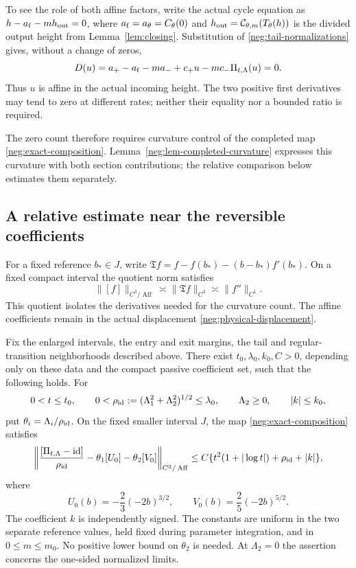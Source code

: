 To see the role of both affine factors, write the actual cycle
equation as \(h-a_{\rm f}-mh_{\rm out}=0\), where
\(a_{\rm f}=a_\theta=C_\theta(0)\) and
\(h_{\rm out}=\mathcal C_{\theta,m}(T_\theta(h))\) is the divided
output height from Lemma~\ref{lem:closing}. Substitution of
\eqref{neg:tail-normalizations} gives, without a change of zeros,
\begin{equation}\label{neg:physical-displacement}
 D(u)=a_+-a_{\rm f}-ma_-+c_+u-mc_-\Pi_{t,\Lambda}(u)=0 .
\end{equation}
Thus \(u\) is affine in the actual incoming height. The two
positive first derivatives may tend to zero at different rates;
neither their equality nor a bounded ratio is required.

The zero count therefore requires curvature control of the completed map
\eqref{neg:exact-composition}. Lemma~\ref{neg:lem-completed-curvature}
expresses this curvature with both section contributions; the relative
comparison below estimates them separately.

\subsection{A relative estimate near the reversible coefficients}

For a fixed reference \(b_*\in J\), write
\(\mathfrak T f=f-f(b_*)-(b-b_*)f'(b_*)\).
On a fixed compact interval the quotient norm satisfies
\[
 \|[f]\|_{C^3/\operatorname{Aff}}
      \asymp\|\mathfrak T f\|_{C^3}\asymp\|f''\|_{C^1} .
\]
This quotient isolates the derivatives needed for the curvature count.
The affine coefficients remain in the actual displacement
\eqref{neg:physical-displacement}.

\begin{theorem}
\label{neg:thm-relative}
Fix the enlarged intervals, the entry and exit margins, the tail and
regular-transition neighborhoods described above. There exist
\(t_0,\lambda_0,k_0,C>0\), depending only on these data and the
compact passive coefficient set, such that the following holds.
For
\[
 0<t\le t_0,\qquad
 0<\rho_{\rm id}:=(\Lambda_1^2+\Lambda_2^2)^{1/2}\le\lambda_0,
 \qquad \Lambda_2\ge0,\qquad |k|\le k_0,
\]
put \(\theta_i=\Lambda_i/\rho_{\rm id}\). On the fixed smaller
interval \(J\), the map \eqref{neg:exact-composition} satisfies
\begin{equation}\label{neg:relative-estimate}
 \left\|\frac{[\Pi_{t,\Lambda}-\mathrm{id}]}{\rho_{\rm id}}
           -\theta_1[U_0]-\theta_2[V_0]\right\|_{C^3/\operatorname{Aff}}
 \le C\{t^2(1+|\log t|)+\rho_{\rm id}+|k|\},
\end{equation}
where
\begin{equation}\label{neg:limiting-rows}
 U_0(b)=-\frac23(-2b)^{3/2},\qquad
 V_0(b)=\frac25(-2b)^{5/2} .
\end{equation}
The coefficient \(k\) is independently signed. The constants are
uniform in the two separate reference values, held fixed during
parameter integration, and in \(0\le m\le m_0\). No positive
lower bound on \(\theta_2\) is needed. At \(\Lambda_2=0\) the
assertion concerns the one-sided normalized limits.
\end{theorem}

